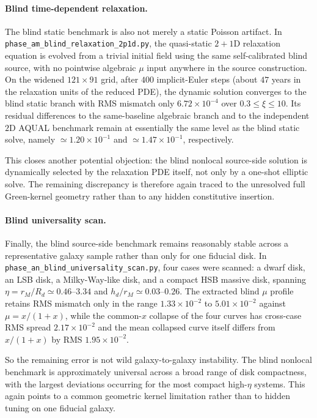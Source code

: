 \documentclass[11pt]{article}
\begin{document}
\paragraph{Blind time-dependent relaxation.}
The blind static benchmark is also not merely a static Poisson artifact.
In \texttt{phase\_am\_blind\_relaxation\_2p1d.py}, the quasi-static
$2{+}1$D relaxation equation is evolved from a trivial initial field
using the same self-calibrated blind source, with no pointwise algebraic
$\mu$ input anywhere in the source construction.  On the widened
$121\times91$ grid, after $400$ implicit-Euler steps (about
$47$ years in the relaxation units of the reduced PDE), the dynamic
solution converges to the blind static branch with RMS mismatch only
$6.72\times10^{-4}$ over $0.3\le\xi\le10$.  Its residual differences to
the same-baseline algebraic branch and to the independent $2$D AQUAL
benchmark remain at essentially the same level as the blind static
solve, namely $\simeq1.20\times10^{-1}$ and
$\simeq1.47\times10^{-1}$, respectively.

This closes another potential objection: the blind nonlocal source-side
solution is dynamically selected by the relaxation PDE itself, not only
by a one-shot elliptic solve.  The remaining discrepancy is therefore
again traced to the unresolved full Green-kernel geometry rather than to
any hidden constitutive insertion.

\paragraph{Blind universality scan.}
Finally, the blind source-side benchmark remains reasonably stable across
a representative galaxy sample rather than only for one fiducial disk.
In \nolinkurl{phase_an_blind_universality_scan.py}, four cases were
scanned: a dwarf disk, an LSB disk, a Milky-Way-like disk, and a compact
HSB massive disk, spanning
\(
\eta=r_M/R_d\simeq 0.46\text{--}3.34
\)
and
\(
h_d/r_M\simeq 0.03\text{--}0.26.
\)
The extracted blind $\mu$ profile retains RMS mismatch only in the range
$1.33\times10^{-2}$ to $5.01\times10^{-2}$ against $\mu=x/(1+x)$, while
the common-\(x\) collapse of the four curves has cross-case RMS spread
$2.17\times10^{-2}$ and the mean collapsed curve itself differs from
$x/(1+x)$ by RMS $1.95\times10^{-2}$.

So the remaining error is not wild galaxy-to-galaxy instability.  The
blind nonlocal benchmark is approximately universal across a broad range
of disk compactness, with the largest deviations occurring for the most
compact high-\(\eta\) systems.  This again points to a common geometric
kernel limitation rather than to hidden tuning on one fiducial galaxy.
\end{document}
